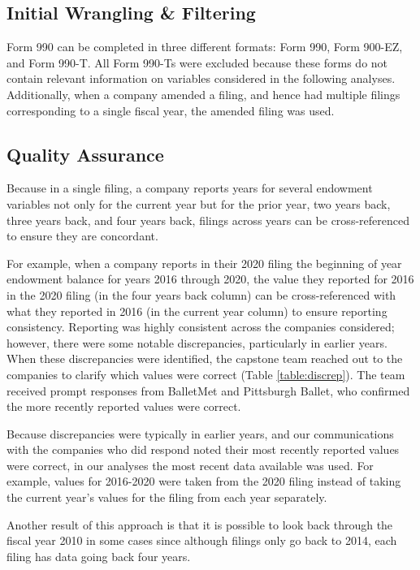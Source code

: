 \documentclass[Dance Data
Project,article,submit,moreauthors,pdftex]{mdpi}
\begin{document}
\hypertarget{initial-wrangling-filtering}{%
\subsection{Initial Wrangling \&
Filtering}\label{initial-wrangling-filtering}}

Form 990 can be completed in three different formats: Form 990, Form
900-EZ, and Form 990-T. All Form 990-Ts were excluded because these
forms do not contain relevant information on variables considered in the
following analyses. Additionally, when a company amended a filing, and
hence had multiple filings corresponding to a single fiscal year, the
amended filing was used.

\hypertarget{quality-assurance}{%
\subsection{Quality Assurance}\label{quality-assurance}}

Because in a single filing, a company reports years for several
endowment variables not only for the current year but for the prior
year, two years back, three years back, and four years back, filings
across years can be cross-referenced to ensure they are concordant.

For example, when a company reports in their 2020 filing the beginning
of year endowment balance for years 2016 through 2020, the value they
reported for 2016 in the 2020 filing (in the four years back column) can
be cross-referenced with what they reported in 2016 (in the current year
column) to ensure reporting consistency. Reporting was highly consistent
across the companies considered; however, there were some notable
discrepancies, particularly in earlier years. When these discrepancies
were identified, the capstone team reached out to the companies to
clarify which values were correct (Table \ref{table:discrep}). The team
received prompt responses from BalletMet and Pittsburgh Ballet, who
confirmed the more recently reported values were correct.

Because discrepancies were typically in earlier years, and our
communications with the companies who did respond noted their most
recently reported values were correct, in our analyses the most recent
data available was used. For example, values for 2016-2020 were taken
from the 2020 filing instead of taking the current year's values for the
filing from each year separately.

Another result of this approach is that it is possible to look back
through the fiscal year 2010 in some cases since although filings only
go back to 2014, each filing has data going back four years.
\end{document}
